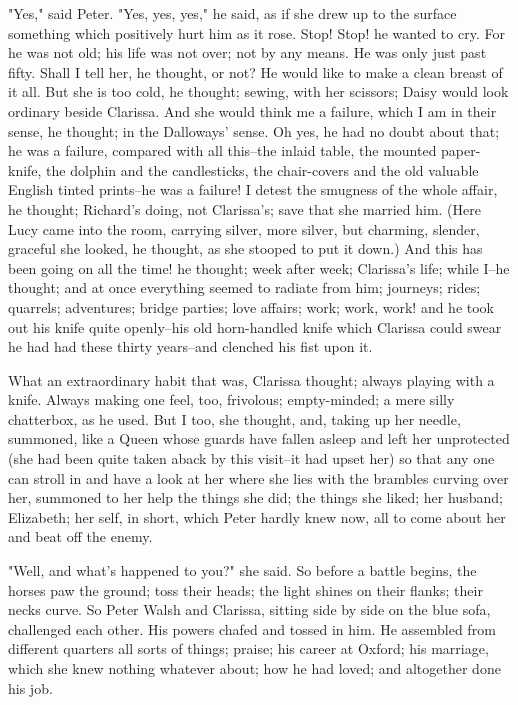 \documentclass[lang=cn,10pt]{elegantbook}
\begin{document}
"Yes," said Peter.  "Yes, yes, yes," he said, as if she drew up to
the surface something which positively hurt him as it rose.  Stop!
Stop! he wanted to cry.  For he was not old; his life was not over;
not by any means.  He was only just past fifty.  Shall I tell her,
he thought, or not?  He would like to make a clean breast of it
all.  But she is too cold, he thought; sewing, with her scissors;
Daisy would look ordinary beside Clarissa.  And she would think me
a failure, which I am in their sense, he thought; in the Dalloways'
sense.  Oh yes, he had no doubt about that; he was a failure,
compared with all this--the inlaid table, the mounted paper-knife,
the dolphin and the candlesticks, the chair-covers and the old
valuable English tinted prints--he was a failure!  I detest the
smugness of the whole affair, he thought; Richard's doing, not
Clarissa's; save that she married him.  (Here Lucy came into the
room, carrying silver, more silver, but charming, slender, graceful
she looked, he thought, as she stooped to put it down.)  And this
has been going on all the time! he thought; week after week;
Clarissa's life; while I--he thought; and at once everything seemed
to radiate from him; journeys; rides; quarrels; adventures; bridge
parties; love affairs; work; work, work! and he took out his knife
quite openly--his old horn-handled knife which Clarissa could swear
he had had these thirty years--and clenched his fist upon it.

What an extraordinary habit that was, Clarissa thought; always
playing with a knife.  Always making one feel, too, frivolous;
empty-minded; a mere silly chatterbox, as he used.  But I too, she
thought, and, taking up her needle, summoned, like a Queen whose
guards have fallen asleep and left her unprotected (she had been
quite taken aback by this visit--it had upset her) so that any one
can stroll in and have a look at her where she lies with the
brambles curving over her, summoned to her help the things she did;
the things she liked; her husband; Elizabeth; her self, in short,
which Peter hardly knew now, all to come about her and beat off the
enemy.

"Well, and what's happened to you?" she said.  So before a battle
begins, the horses paw the ground; toss their heads; the light
shines on their flanks; their necks curve.  So Peter Walsh and
Clarissa, sitting side by side on the blue sofa, challenged each
other.  His powers chafed and tossed in him.  He assembled from
different quarters all sorts of things; praise; his career at
Oxford; his marriage, which she knew nothing whatever about; how he
had loved; and altogether done his job.
\end{document}

